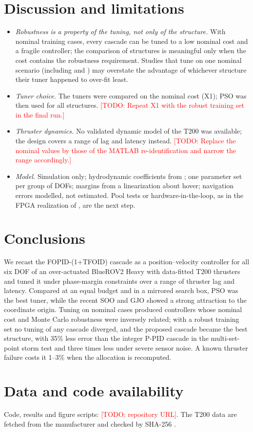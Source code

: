 \documentclass[review,12pt]{elsarticle}
\newcommand{\todo}[1]{\textcolor{red}{[TODO: #1]}}
\begin{document}
\section{Discussion and limitations}
\begin{itemize}
\item \emph{Robustness is a property of the tuning, not only of the structure.} With nominal training cases,
  every cascade can be tuned to a low nominal cost and a fragile controller; the comparison of structures is
  meaningful only when the cost contains the robustness requirement. Studies that tune on one nominal scenario
  (including \cite{ersoy2026jestech} and \cite{nour2026scirep}) may overstate the advantage of whichever
  structure their tuner happened to over-fit least.
\item \emph{Tuner choice.} The tuners were compared on the nominal cost (X1); PSO was then used for all
  structures. \todo{Repeat X1 with the robust training set in the final run.}
\item \emph{Thruster dynamics.} No validated dynamic model of the T200 was available; the design covers a
  range of lag and latency instead. \todo{Replace the nominal values by those of the MATLAB
  re-identification and narrow the range accordingly.}
\item \emph{Model.} Simulation only; hydrodynamic coefficients from \cite{vonbenzon2022}; one parameter
  set per group of DOFs; margins from a linearization about hover; navigation errors modelled, not estimated.
  Pool tests or hardware-in-the-loop, as in the FPGA realization of \cite{ersoy2026jestech}, are the next step.
\end{itemize}

\section{Conclusions}
We recast the FOPID-(1+TFOID) cascade as a position--velocity controller for all six DOF of an over-actuated
BlueROV2 Heavy with data-fitted T200 thrusters and tuned it under phase-margin constraints over a range of
thruster lag and latency. Compared at an equal budget and in a mirrored search box, PSO was the best tuner,
while the recent SOO and GJO showed a strong attraction to the coordinate origin. Tuning on nominal cases
produced controllers whose nominal cost and Monte Carlo robustness were inversely related; with a robust
training set no tuning of any cascade diverged, and the proposed cascade became the best structure, with 35\%
less error than the integer P-PID cascade in the multi-set-point storm test and three times less under severe
sensor noise. A known thruster failure costs it 1--3\% when the allocation is recomputed.

\section*{Data and code availability}
Code, results and figure scripts: \todo{repository URL}. The T200 data are fetched from the manufacturer and
checked by SHA-256 \cite{t200data}.



\end{document}
